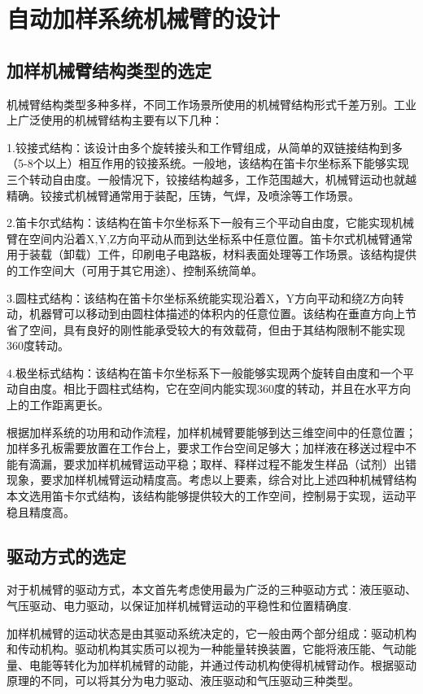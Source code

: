 \chapter{自动加样系统机械臂的设计}
\section{加样机械臂结构类型的选定}
机械臂结构类型多种多样，不同工作场景所使用的机械臂结构形式千差万别。工业上广泛使用的机械臂结构主要有以下几种：

1.铰接式结构：该设计由多个旋转接头和工作臂组成，从简单的双链接结构到多（5-8个以上）相互作用的铰接系统。一般地，该结构在笛卡尔坐标系下能够实现三个转动自由度。一般情况下，铰接结构越多，工作范围越大，机械臂运动也就越精确。铰接式机械臂通常用于装配，压铸，气焊，及喷涂等工作场景。

2.笛卡尔式结构：该结构在笛卡尔坐标系下一般有三个平动自由度，它能实现机械臂在空间内沿着X,Y,Z方向平动从而到达坐标系中任意位置。笛卡尔式机械臂通常用于装载（卸载）工件，印刷电子电路板，材料表面处理等工作场景。该结构提供的工作空间大（可用于其它用途）、控制系统简单。

3.圆柱式结构：该结构在笛卡尔坐标系统能实现沿着X，Y方向平动和绕Z方向转动，机器臂可以移动到由圆柱体描述的体积内的任意位置。该结构在垂直方向上节省了空间，具有良好的刚性能承受较大的有效载荷，但由于其结构限制不能实现360度转动。

4.极坐标式结构：该结构在笛卡尔坐标系下一般能够实现两个旋转自由度和一个平动自由度。相比于圆柱式结构，它在空间内能实现360度的转动，并且在水平方向上的工作距离更长。

根据加样系统的功用和动作流程，加样机械臂要能够到达三维空间中的任意位置；加样多孔板需要放置在工作台上，要求工作台空间足够大；加样液在移送过程中不能有滴漏，要求加样机械臂运动平稳；取样、释样过程不能发生样品（试剂）出错现象，要求加样机械臂运动精度高。考虑以上要素，综合对比上述四种机械臂结构本文选用笛卡尔式结构，该结构能够提供较大的工作空间，控制易于实现，运动平稳且精度高。
\section{驱动方式的选定}
对于机械臂的驱动方式，本文首先考虑使用最为广泛的三种驱动方式：液压驱动、气压驱动、电力驱动，以保证加样机械臂运动的平稳性和位置精确度.

加样机械臂的运动状态是由其驱动系统决定的，它一般由两个部分组成：驱动机构和传动机构。驱动机构其实质可以视为一种能量转换装置，它能将液压能、气动能量、电能等转化为加样机械臂的动能，并通过传动机构使得机械臂动作。根据驱动原理的不同，可以将其分为电力驱动、液压驱动和气压驱动三种类型。

